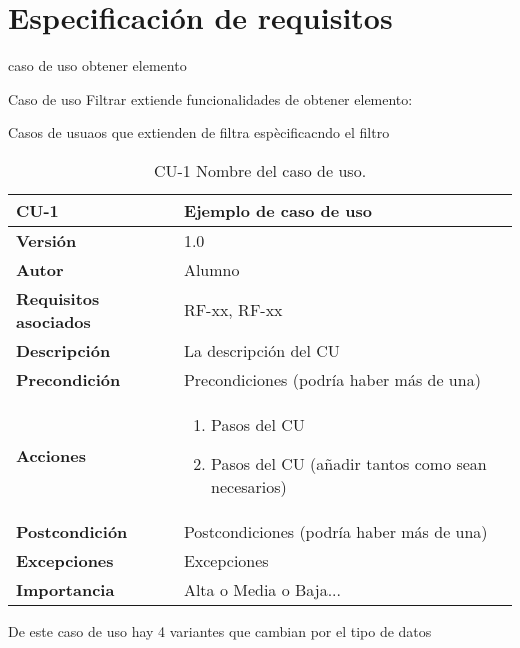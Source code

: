 \section{Especificación de requisitos}



caso de uso obtener elemento

Caso de uso Filtrar extiende funcionalidades de obtener elemento:

Casos de usuaos que extienden de filtra espècificacndo el filtro



\begin{table}[p]
	\centering
	\begin{tabularx}{\linewidth}{ p{} p{} }
		\toprule
		\textbf{CU-1}    & \textbf{Ejemplo de caso de uso}\\
		\toprule
		\textbf{Versión}              & 1.0    \\
		\textbf{Autor}                & Alumno \\
		\textbf{Requisitos asociados} & RF-xx, RF-xx \\
		\textbf{Descripción}          & La descripción del CU \\
		\textbf{Precondición}         & Precondiciones (podría haber más de una) \\
		\textbf{Acciones}             &
		\begin{enumerate}
			\def\labelenumi{\arabic{enumi}.}
			\tightlist
			\item Pasos del CU
			\item Pasos del CU (añadir tantos como sean necesarios)
		\end{enumerate}\\
		\textbf{Postcondición}        & Postcondiciones (podría haber más de una) \\
		\textbf{Excepciones}          & Excepciones \\
		\textbf{Importancia}          & Alta o Media o Baja... \\
		\bottomrule
	\end{tabularx}
	\caption{CU-1 Nombre del caso de uso.}
\end{table}

De este caso de uso hay 4 variantes que cambian por el tipo de datos